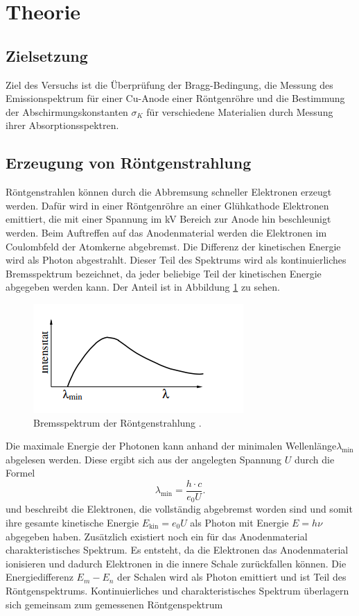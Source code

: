 \section{Theorie}
\label{sec:Theorie}
\subsection{Zielsetzung}
Ziel des Versuchs ist die Überprüfung der Bragg-Bedingung, die Messung des Emissionspektrum für einer Cu-Anode
einer Röntgenröhre und die Bestimmung der Abschirmungskonstanten $\sigma_K$ für verschiedene Materialien durch Messung ihrer Absorptionsspektren.
\subsection{Erzeugung von Röntgenstrahlung}
Röntgenstrahlen können durch die Abbremsung schneller Elektronen erzeugt werden. Dafür wird in einer Röntgenröhre an einer
Glühkathode Elektronen emittiert, die mit einer Spannung im kV Bereich zur Anode hin beschleunigt werden. Beim Auftreffen auf das Anodenmaterial werden 
die Elektronen im Coulombfeld der Atomkerne abgebremst. Die Differenz der kinetischen Energie wird als Photon abgestrahlt. Dieser Teil des Spektrums wird als kontinuierliches 
Bremsspektrum bezeichnet, da jeder beliebige Teil der kinetischen Energie abgegeben werden kann. Der Anteil ist in Abbildung \ref{fig:Brems} zu sehen.
\begin{figure}[H]
    \centering
    \includegraphics[scale=1.5]{content/Bremsspektrum.png}
    \caption{Bremsspektrum der Röntgenstrahlung \cite{sample}.}
    \label{fig:Brems}
\end{figure}
\noindent Die maximale Energie der Photonen kann anhand der minimalen Wellenlänge$\lambda_\text{min}$ abgelesen werden. Diese ergibt sich aus der angelegten Spannung $U$
durch die Formel
\begin{equation}
    \lambda_\text{min}=\frac{h\cdot c}{e_0U}.
    \label{eq:minWelle}
\end{equation}
und beschreibt die Elektronen, die vollständig abgebremst worden sind und somit ihre gesamte kinetische Energie $E_\text{kin}=e_0U$ als Photon mit Energie $E=h\nu$ abgegeben haben.
Zusätzlich existiert noch ein für das Anodenmaterial charakteristisches Spektrum. Es entsteht, da die Elektronen das Anodenmaterial ionisieren und dadurch
Elektronen in die innere Schale zurückfallen können. Die Energiedifferenz $E_m-E_n$ der Schalen wird als Photon emittiert und ist Teil des Röntgenspektrums.
Kontinuierliches und charakteristisches Spektrum überlagern sich gemeinsam zum gemessenen Röntgenspektrum
